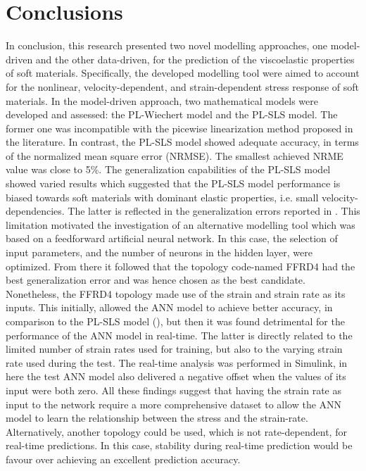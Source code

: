 \section{Conclusions}

In conclusion, this research presented two novel modelling approaches, one model-driven and the other data-driven, for the prediction of the viscoelastic properties of soft materials. Specifically, the developed modelling tool were aimed to account for the nonlinear, velocity-dependent, and strain-dependent stress response of soft materials. In the model-driven approach, two mathematical models were developed and assessed: the PL-Wiechert model and the PL-SLS model. The former one was incompatible with the picewise linearization method proposed in the literature. In contrast, the PL-SLS model showed adequate accuracy, in terms of the normalized mean square error (NRMSE). The smallest achieved NRME value was close to 5\%. The generalization capabilities of the PL-SLS model showed varied results which suggested that the PL-SLS model performance is biased towards soft materials with dominant elastic properties, i.e. small velocity-dependencies. The latter is reflected in the generalization errors reported in . This limitation motivated the investigation of an alternative modelling tool which was based on a feedforward artificial neural network. In this case, the selection of input parameters, and the number of neurons in the hidden layer, were optimized. From there it followed that the topology code-named FFRD4 had the best generalization error and was hence chosen as the best candidate. Nonetheless, the FFRD4 topology made use of the strain and strain rate as its inputs. This initially, allowed the ANN model to achieve better accuracy, in comparison to the PL-SLS model (), but then it was found detrimental for the performance of the ANN model in real-time. The latter is directly related to the limited number of strain rates used for training, but also to the varying strain rate used during the test. The real-time analysis was performed in Simulink, in here the test ANN model also delivered a negative offset when the values of its input were both zero. All these findings suggest that having the strain rate as input to the network require a more comprehensive dataset to allow the ANN model to learn the relationship between the stress and the strain-rate. Alternatively, another topology could be used, which is not rate-dependent, for real-time predictions. In this case, stability during real-time prediction would be favour over achieving an excellent prediction accuracy.

